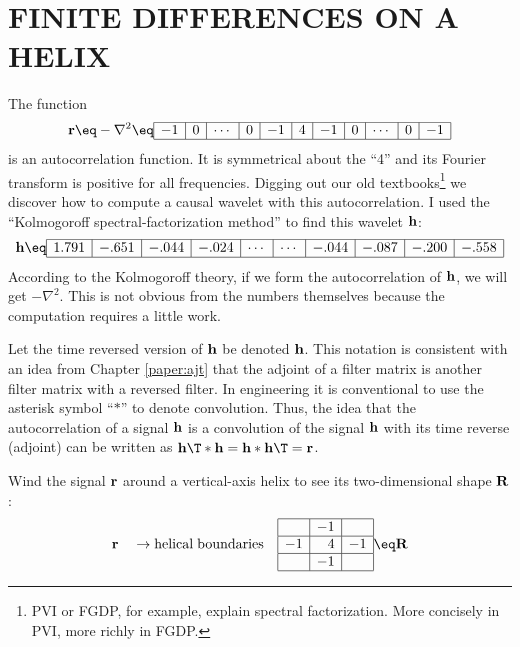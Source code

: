 \section{FINITE DIFFERENCES ON A HELIX}
The function
\begin{equation}
\label{eqn:2dlapin1d}
\bold r \eq
-\nabla^2
\eq
\begin{array}{|r|r|r|r|r|r|r|r|r|r|r|r|r|r|r|} \hline
-1&0&\cdots&0&-1&4&-1&0& \cdots&0&-1
\\ \hline
\end{array}
\end{equation}
is an autocorrelation function.
It is symmetrical about the ``4'' and its Fourier transform
is positive for all frequencies.
Digging out our old textbooks\footnote{
        PVI or FGDP, for example,
        explain spectral factorization.
        More concisely in PVI, more richly in FGDP.
        }
we discover
how to compute a causal wavelet with this autocorrelation.
I used the ``Kolmogoroff spectral-factorization method''
to find this wavelet $\bold h$:
\begin{equation}
{\bold h}
\eq
\begin{array}{|r|r|r|r|r|r|r|r|r|r|r|r|r|r|r|}
\hline
1.791&-.651&-.044&-.024&\cdots&\cdots&-.044&-.087&-.200&-.558 \\
\hline
\end{array}
\label{eqn:lapfacrow}
\end{equation}
According to the Kolmogoroff theory,
if we form the autocorrelation of
$\bold h$,
we will get $-\nabla^2$.
This is not obvious from the numbers themselves
because the computation requires a little work.
\par
Let the time reversed version of
$\bold h$
be denoted
$\bold h$.
This notation is consistent with an idea from
Chapter \ref{paper:ajt} that the adjoint of a filter matrix
is another filter matrix with a reversed filter.
In engineering it is conventional to use the asterisk symbol
``$\ast$'' to denote convolution.
Thus, the idea that the autocorrelation of a 
signal $\bold h$
is a convolution of the
signal $\bold h$
with its time reverse (adjoint)
can be written as
$ {\bold h}\T \ast {\bold h} = {\bold h} \ast {\bold h}\T = {\bold r}$.



\par
Wind the signal $\bold r$ around a
vertical-axis helix to see its two-dimensional shape $\bold R$:
\begin{equation}
\bold r
\quad
\rightarrow{\rm helical \; boundaries}
\quad
\begin{array}{|r|r|r|}  \hline
& -1 & \\
\hline
-1 & 4 & -1\\
\hline
& -1 & \\
\hline
\end{array}
\eq
\bold R
\label{eqn:lap2d}
\end{equation}


